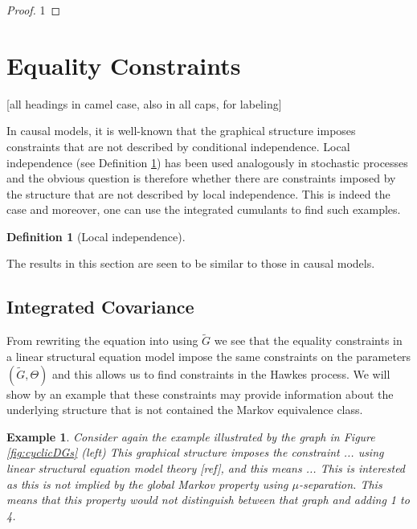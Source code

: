 \documentclass[accepted]{uai2021} %
\newtheorem{defn}[thm]{Definition}
\newtheorem{exmp}[thm]{Example}
\begin{document}
\begin{proof}
	1
\end{proof}


\section{Equality Constraints}

[all headings in camel case, also in all caps, for labeling]

In causal models, it is well-known that the graphical structure imposes 
constraints that 
are not described by conditional independence. Local independence (see 
Definition \ref{def:li}) has been used analogously in stochastic processes and 
the obvious question is therefore whether there are constraints imposed by the 
structure that are not described by local independence. This is indeed the case 
and moreover, one can use the integrated cumulants to find such examples.

\begin{defn}[Local independence]
	\label{def:li}
\end{defn}

The results in this section are seen to be similar to those in causal models.

\subsection{Integrated Covariance}

From rewriting the equation into using $\tilde{G}$ we see that the equality 
constraints in a linear structural equation model impose the same constraints 
on the parameters $(\tilde{G}, \Theta)$ and this allows us to find constraints 
in the Hawkes process. We will show by an example that these constraints may 
provide information about the underlying structure that is not contained the 
Markov equivalence class.




\begin{exmp}
	Consider again the example illustrated by the graph in Figure 
	\ref{fig:cyclicDGs} (left)
	This graphical structure imposes the constraint ... using linear structural 
	equation model theory [ref], and this means ... This is interested as this 
	is not implied by the global Markov property using $\mu$-separation. This 
	means that this property would not distinguish between that graph and 
	adding 1 to 4. 
\end{exmp}
\end{document}
